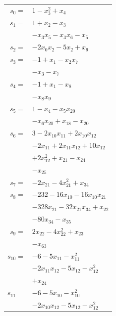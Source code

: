 \begingroup
\small
\setlength{\tabcolsep}{2pt}
\setlength{\LTleft}{0pt}
\begin{longtable}{@{}r@{\;}l@{}}
\(s_{0}=\) & \(\displaystyle 1 -x_{3}^{2} +x_{4}\) \\[3pt]
\(s_{1}=\) & \(\displaystyle 1 +x_{2} -x_{3}\) \\
 & \(\displaystyle -x_{3}x_{5} -x_{3}x_{6} -x_{5}\) \\[3pt]
\(s_{2}=\) & \(\displaystyle -2x_{0}x_{2} -5x_{2} +x_{9}\) \\[3pt]
\(s_{3}=\) & \(\displaystyle -1 +x_{1} -x_{2}x_{7}\) \\
 & \(\displaystyle -x_{3} -x_{7}\) \\[3pt]
\(s_{4}=\) & \(\displaystyle -1 +x_{1} -x_{8}\) \\
 & \(\displaystyle -x_{8}x_{9}\) \\[3pt]
\(s_{5}=\) & \(\displaystyle 1 -x_{4} -x_{5}x_{20}\) \\
 & \(\displaystyle -x_{6}x_{20} +x_{18} -x_{20}\) \\[3pt]
\(s_{6}=\) & \(\displaystyle 3 -2x_{10}x_{11} +2x_{10}x_{12}\) \\
 & \(\displaystyle -2x_{11} +2x_{11}x_{12} +10x_{12}\) \\
 & \(\displaystyle +2x_{12}^{2} +x_{21} -x_{24}\) \\
 & \(\displaystyle -x_{25}\) \\[3pt]
\(s_{7}=\) & \(\displaystyle -2x_{21} -4x_{21}^{2} +x_{34}\) \\[3pt]
\(s_{8}=\) & \(\displaystyle -232 -16x_{10} -16x_{10}x_{21}\) \\
 & \(\displaystyle -328x_{21} -32x_{21}x_{34} +x_{22}\) \\
 & \(\displaystyle -80x_{34} -x_{35}\) \\[3pt]
\(s_{9}=\) & \(\displaystyle 2x_{22} -4x_{22}^{2} +x_{23}\) \\
 & \(\displaystyle -x_{63}\) \\[3pt]
\(s_{10}=\) & \(\displaystyle -6 -5x_{11} -x_{11}^{2}\) \\
 & \(\displaystyle -2x_{11}x_{12} -5x_{12} -x_{12}^{2}\) \\
 & \(\displaystyle +x_{24}\) \\[3pt]
\(s_{11}=\) & \(\displaystyle -6 -5x_{10} -x_{10}^{2}\) \\
 & \(\displaystyle -2x_{10}x_{12} -5x_{12} -x_{12}^{2}\) \\

\end{longtable}
